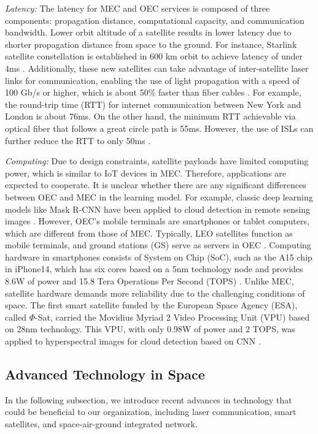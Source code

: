 \documentclass[lettersize,journal]{IEEEtran}
\begin{document}
\emph{Latency:} 
The latency for MEC and OEC services is composed of three components: propagation distance, computational capacity, and communication bandwidth. Lower orbit altitude of a satellite results in lower latency due to shorter propagation distance from space to the ground. For instance, Starlink satellite constellation is established in 600 km orbit to achieve latency of under 4ms \cite{RN146}. Additionally, these new satellites can take advantage of inter-satellite laser links for communication, enabling the use of light propagation with a speed of 100 Gb/s or higher, which is about 50\% faster than fiber cables \cite{RN181}. For example, the round-trip time (RTT) for internet communication between New York and London is about 76ms. On the other hand, the minimum RTT achievable via optical fiber that follows a great circle path is 55ms. However, the use of ISLs can further reduce the RTT to only 50ms \cite{RN182}.

\emph{Computing:} 
Due to design constraints, satellite payloads have limited computing power, which is similar to IoT devices in MEC. Therefore, applications are expected to cooperate. It is unclear whether there are any significant differences between OEC and MEC in the learning model. For example, classic deep learning models like Mask R-CNN \cite{he2017mask} have been applied to cloud detection in remote sensing images \cite{RN184}. However, OEC's mobile terminals are smartphones or tablet computers, which are different from those of MEC. Typically, LEO satellites function as mobile terminals, and ground stations (GS) serve as servers in OEC \cite{RN61}. Computing hardware in smartphones consists of System on Chip (SoC), such as the A15 chip in iPhone14, which has six cores based on a 5nm technology node and provides 8.6W of power and 15.8 Tera Operations Per Second (TOPS) \cite{iphone}. Unlike MEC, satellite hardware demands more reliability due to the challenging conditions of space. The first smart satellite funded by the European Space Agency (ESA), called $\Phi$-Sat, carried the Movidius Myriad 2 Video Processing Unit (VPU) \cite{RN185} based on 28nm technology. This VPU, with only 0.98W of power and 2 TOPS, was applied to hyperspectral images for cloud detection based on CNN \cite{RN186}.

\subsection{Advanced Technology in Space}
In the following subsection, we introduce recent advances in technology that could be beneficial to our organization, including laser communication, smart satellites, and space-air-ground integrated network.
\end{document}
